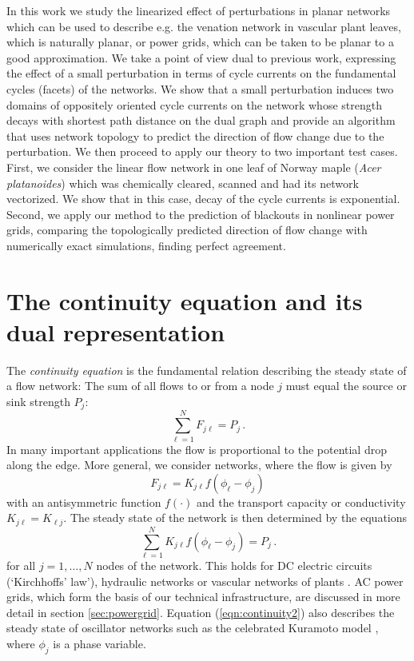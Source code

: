 \documentclass[10pt,aps,pra,twocolumn,superscriptaddress]{revtex4-1}
\newcommand{\be}{\begin{equation}}
\newcommand{\ee}{\end{equation}}
\begin{document}
In this work we study the linearized effect of perturbations 
in planar networks which can be used to describe e.g. the venation
network in vascular plant leaves, which is naturally planar, or
power grids, which can be taken to be planar to a good approximation.
We take a point of view dual to previous work, expressing the
effect of a small perturbation in terms of cycle currents on the
fundamental cycles (facets) of the networks.
We show that a small perturbation induces two domains of oppositely
oriented cycle currents on the network whose strength decays
with shortest path distance on the dual graph and provide an
algorithm that uses network topology to predict the direction
of flow change due to the perturbation.
We then proceed to apply our theory to two important test cases.
First, we consider the linear flow network in one leaf of
Norway maple (\emph{Acer platanoides}) which was chemically cleared,
scanned and had its network vectorized. We show that in this case,
decay of the cycle currents is exponential.
Second, we apply our method to the prediction of blackouts in nonlinear
power grids, comparing the topologically predicted direction of
flow change with numerically exact simulations, finding perfect
agreement.

\section{The continuity equation and its dual representation}
\label{sec:continuity}

The \emph{continuity equation} is the fundamental relation describing the steady state of a flow network: The sum of all flows to or from a node $j$ must equal the source or sink strength $P_j$:
\be
   \sum_{\ell=1}^N F_{j \ell} = P_j \, .
   \label{eqn:continuity1}
\ee
In many important applications the flow is proportional to the potential drop along the edge. More general, we consider networks, where the flow is given by
\be
   F_{j \ell} = K_{j \ell} f(\phi_\ell - \phi_j)
    \label{eqn:flow-pot}
\ee
with an antisymmetric function $f(\cdot)$ and the transport capacity or conductivity $K_{j\ell} = K_{\ell j}$. The steady state of the network is then determined by the equations
\be
    \sum_{\ell=1}^N K_{j \ell} f(\phi_\ell - \phi_j) = P_j \, .
    \label{eqn:continuity2}
\ee
for all $j = 1,\ldots, N$ nodes of the network. This holds for DC electric circuits (`Kirchhoffs' law'), hydraulic networks \cite{Dura04} or vascular networks of plants \cite{Kati10}. AC power grids, which form the basis of our technical infrastructure, are discussed in more detail in section \ref{sec:powergrid}. Equation (\ref{eqn:continuity2}) also describes the steady state of oscillator networks such as the celebrated Kuramoto model \cite{Kura75,Stro00,Aceb05}, where $\phi_j$ is a phase variable.
\end{document}
